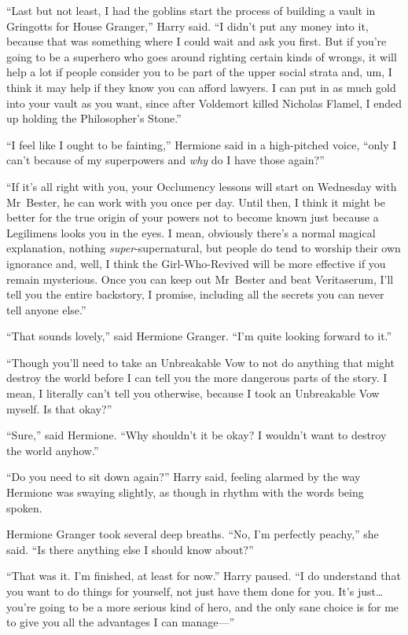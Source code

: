“Last but not least, I had the goblins start the process of building a vault in Gringotts for House Granger,” Harry said. “I didn’t put any money into it, because that was something where I could wait and ask you first. But if you’re going to be a superhero who goes around righting certain kinds of wrongs, it will help a lot if people consider you to be part of the upper social strata and, um, I think it may help if they know you can afford lawyers. I can put in as much gold into your vault as you want, since after Voldemort killed Nicholas Flamel, I ended up holding the Philosopher’s Stone.”

“I feel like I ought to be fainting,” Hermione said in a high-pitched voice, “only I can’t because of my superpowers and \emph{why} do I have those again?”

“If it’s all right with you, your Occlumency lessons will start on Wednesday with Mr~Bester, he can work with you once per day. Until then, I think it might be better for the true origin of your powers not to become known just because a Legilimens looks you in the eyes. I mean, obviously there’s a normal magical explanation, nothing \emph{super}-supernatural, but people do tend to worship their own ignorance and, well, I think the Girl-Who-Revived will be more effective if you remain mysterious. Once you can keep out Mr~Bester and beat Veritaserum, I’ll tell you the entire backstory, I promise, including all the secrets you can never tell anyone else.”

“That sounds lovely,” said Hermione Granger. “I’m quite looking forward to it.”

“Though you’ll need to take an Unbreakable Vow to not do anything that might destroy the world before I can tell you the more dangerous parts of the story. I mean, I literally can’t tell you otherwise, because I took an Unbreakable Vow myself. Is that okay?”

“Sure,” said Hermione. “Why shouldn’t it be okay? I wouldn’t want to destroy the world anyhow.”

“Do you need to sit down again?” Harry said, feeling alarmed by the way Hermione was swaying slightly, as though in rhythm with the words being spoken.

Hermione Granger took several deep breaths. “No, I’m perfectly peachy,” she said. “Is there anything else I should know about?”

“That was it. I’m finished, at least for now.” Harry paused. “I do understand that you want to do things for yourself, not just have them done for you. It’s just…you’re going to be a more serious kind of hero, and the only sane choice is for me to give you all the advantages I can manage—”

